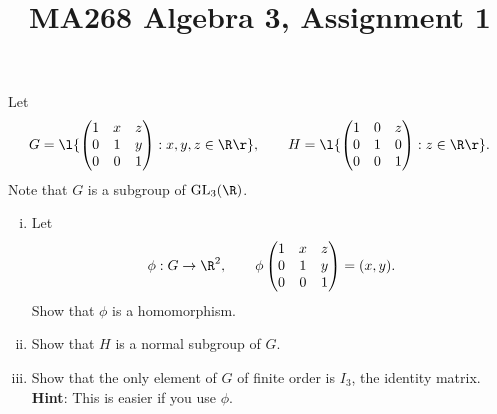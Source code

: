 \documentclass[a4paper]{article}
\title{MA268 Algebra 3, Assignment 1}
\begin{document}
\maketitle

\setlength{\parindent}{0em}
\setlength{\parskip}{1em}



\begin{questionbody}
Let \[
    G = \l\{ \begin{pmatrix}
        1 & x & z \\
        0 & 1 & y \\
        0 & 0 & 1
    \end{pmatrix} : x, y, z \in \R \r\}, \qquad
    H = \l\{ \begin{pmatrix}
        1 & 0 & z \\
        0 & 1 & 0 \\
        0 & 0 & 1
    \end{pmatrix} : z \in \R \r\}.
\] Note that $G$ is a subgroup of $\mathrm{GL}_3(\R)$.
%
\begin{enumerate}[(i)]
\item Let \[
    \phi : G \to \R^2, \qquad \phi \begin{pmatrix}
        1 & x & z \\
        0 & 1 & y \\
        0 & 0 & 1
    \end{pmatrix} = (x, y).
\] Show that $\phi$ is a homomorphism.

\item Show that $H$ is a normal subgroup of $G$.

\item Show that the only element of $G$ of finite order is $I_3$, the identity matrix. \textbf{Hint}: This is easier if you use $\phi$.
\end{enumerate}
\end{questionbody}

\subsection{~} %
\end{document}
